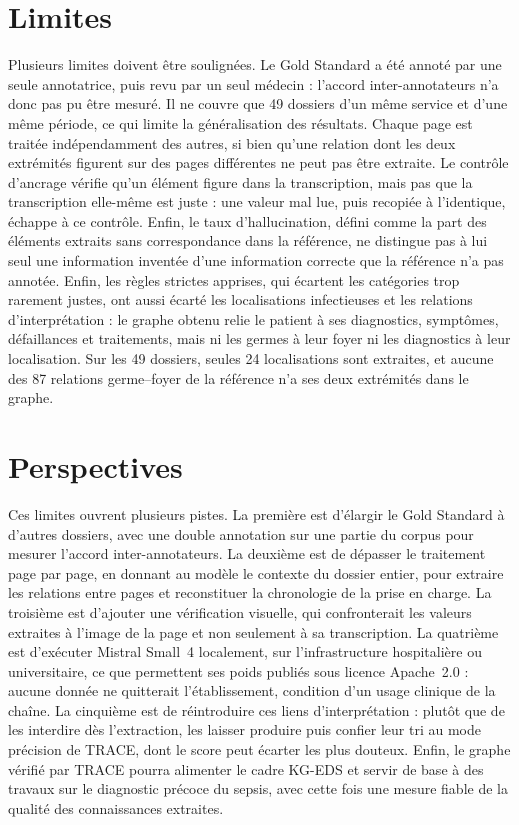 \section*{Limites}

Plusieurs limites doivent être soulignées. Le Gold Standard a été annoté par une seule annotatrice, puis revu par un seul médecin : l'accord inter-annotateurs n'a donc pas pu être mesuré. Il ne couvre que 49 dossiers d'un même service et d'une même période, ce qui limite la généralisation des résultats. Chaque page est traitée indépendamment des autres, si bien qu'une relation dont les deux extrémités figurent sur des pages différentes ne peut pas être extraite. Le contrôle d'ancrage vérifie qu'un élément figure dans la transcription, mais pas que la transcription elle-même est juste : une valeur mal lue, puis recopiée à l'identique, échappe à ce contrôle. Enfin, le taux d'hallucination, défini comme la part des éléments extraits sans correspondance dans la référence, ne distingue pas à lui seul une information inventée d'une information correcte que la référence n'a pas annotée. Enfin, les règles strictes apprises, qui écartent les catégories trop rarement justes, ont aussi écarté les localisations infectieuses et les relations d'interprétation : le graphe obtenu relie le patient à ses diagnostics, symptômes, défaillances et traitements, mais ni les germes à leur foyer ni les diagnostics à leur localisation. Sur les 49 dossiers, seules 24 localisations sont extraites, et aucune des 87 relations germe--foyer de la référence n'a ses deux extrémités dans le graphe.

\section*{Perspectives}

Ces limites ouvrent plusieurs pistes. La première est d'élargir le Gold Standard à d'autres dossiers, avec une double annotation sur une partie du corpus pour mesurer l'accord inter-annotateurs. La deuxième est de dépasser le traitement page par page, en donnant au modèle le contexte du dossier entier, pour extraire les relations entre pages et reconstituer la chronologie de la prise en charge. La troisième est d'ajouter une vérification visuelle, qui confronterait les valeurs extraites à l'image de la page et non seulement à sa transcription. La quatrième est d'exécuter Mistral Small~4 localement, sur l'infrastructure hospitalière ou universitaire, ce que permettent ses poids publiés sous licence Apache~2.0 : aucune donnée ne quitterait l'établissement, condition d'un usage clinique de la chaîne. La cinquième est de réintroduire ces liens d'interprétation : plutôt que de les interdire dès l'extraction, les laisser produire puis confier leur tri au mode précision de TRACE, dont le score peut écarter les plus douteux. Enfin, le graphe vérifié par TRACE pourra alimenter le cadre KG-EDS et servir de base à des travaux sur le diagnostic précoce du sepsis, avec cette fois une mesure fiable de la qualité des connaissances extraites.

